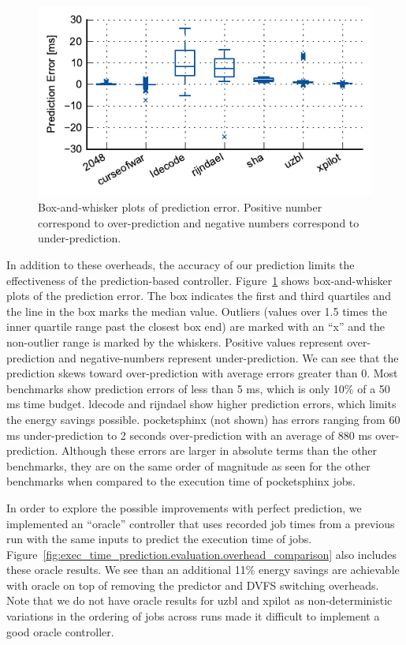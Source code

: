 \begin{figure}
  \begin{center}
    \includegraphics{exec_time_prediction/data/prediction_error.pdf}
    \caption{Box-and-whisker plots of prediction error. Positive number
    correspond to over-prediction and negative numbers correspond to
    under-prediction.}
    \label{fig:exec_time_prediction.evaluation.prediction_error}
  \end{center}
\end{figure}

In addition to these overheads, the accuracy of our prediction limits the
effectiveness of the prediction-based controller.
Figure~\ref{fig:exec_time_prediction.evaluation.prediction_error} shows
box-and-whisker plots of the prediction error.  The box indicates the first and
third quartiles and the line in the box marks the median value. Outliers
(values over 1.5 times the inner quartile range past the closest box end) are
marked with an ``x'' and the non-outlier range is marked by the whiskers.
Positive values represent over-prediction and negative-numbers represent
under-prediction. We can see that the prediction skews toward over-prediction
with average errors greater than 0.  Most benchmarks show prediction errors of
less than 5 ms, which is only 10\% of a 50 ms time budget. ldecode and rijndael
show higher prediction errors, which limits the energy savings possible.
pocketsphinx (not shown) has errors ranging from 60 ms under-prediction to 2
seconds over-prediction with an average of 880 ms over-prediction. Although
these errors are larger in absolute terms than the other benchmarks, they are
on the same order of magnitude as seen for the other benchmarks when 
compared to the execution time of pocketsphinx jobs.

In order to explore the possible improvements with perfect prediction, we
implemented an ``oracle'' controller that uses recorded job times from a
previous run with the same inputs to predict the execution time of jobs.
Figure~\ref{fig:exec_time_prediction.evaluation.overhead_comparison} also
includes these oracle results. We see than an additional 11\% energy savings
are achievable with oracle on top of removing the predictor and DVFS switching
overheads. Note that we do not have oracle results for uzbl and xpilot as
non-deterministic variations in the ordering of jobs across runs made it
difficult to implement a good oracle controller.

